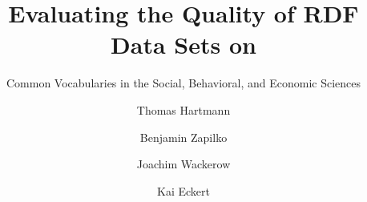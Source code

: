 \documentclass{llncs}
\begin{document}
\renewcommand{\arraystretch}{1.3}
%
%

\title{Evaluating the Quality of RDF Data Sets on}
\subtitle{Common Vocabularies in the Social, Behavioral, and Economic Sciences}


%
\author{Thomas Hartmann \and Benjamin Zapilko \and Joachim Wackerow \and Kai Eckert}
%
\authorrunning{} %
%

\maketitle              %
\end{document}

